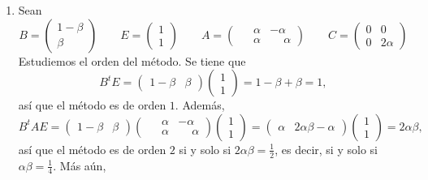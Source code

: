 \documentclass[11pt]{report}
\begin{document}
\begin{enumerate}
    \item Sean
    \[B = \left(\begin{array}{c}
        1-\beta \\
        \beta
    \end{array}\right)  \qquad E = \left(\begin{array}{c}
        1 \\
        1
    \end{array}\right) \qquad A = \left(\begin{array}{cc}
        \phantom{-}\alpha & -\alpha \\
        \phantom{-}\alpha & \phantom{-}\alpha 
    \end{array}\right) \qquad C=\left(\begin{array}{cc}
        0 & 0 \\
        0 & 2\alpha
    \end{array}\right)\]
    Estudiemos el orden del método. Se tiene que
    \[B^tE = \left(\begin{array}{cc}
        1-\beta & \beta
    \end{array}\right)\left(\begin{array}{c}
        1 \\
        1
    \end{array}\right) = 1-\beta+\beta = 1,\]
    así que el método es de orden $1$. Además,
    \[B^tAE = \left(\begin{array}{cc}
        1-\beta & \beta
    \end{array}\right)\left(\begin{array}{cc}
        \phantom{-}\alpha & -\alpha \\
        \phantom{-}\alpha & \phantom{-}\alpha 
    \end{array}\right)\left(\begin{array}{c}
        1 \\
        1
    \end{array}\right) =  \left(\begin{array}{cc}
        \alpha & 2\alpha\beta - \alpha
    \end{array}\right)\left(\begin{array}{c}
        1 \\
        1
    \end{array}\right) = 2\alpha\beta,\]
    así que el método es de orden $2$ si y solo si $2\alpha\beta = \frac{1}{2}$, es decir, si y solo si $\alpha\beta = \frac{1}{4}$. Más aún,
    \[
\]
\end{enumerate}
\end{document}
